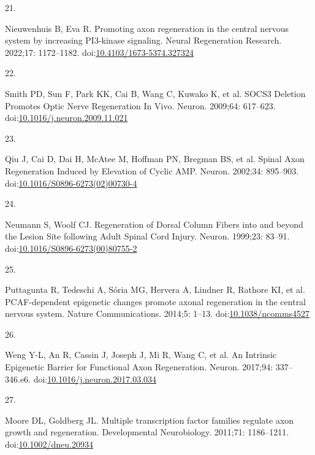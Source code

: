 \documentclass[
  12pt,
  a4paper,
]{book}
\newlength{\cslhangindent}
\newlength{\csllabelwidth}
\newlength{\cslentryspacingunit} %
\newenvironment{CSLReferences}[2] %
 {%
  \setlength{\parindent}{0pt}
  \ifodd #1
  \let\oldpar\par
  \def\par{\hangindent=\cslhangindent\oldpar}
  \fi
  \setlength{\parskip}{#2\cslentryspacingunit}
 }%
 {}
\newcommand{\CSLLeftMargin}[1]{\parbox[t]{\csllabelwidth}{#1}}
\newcommand{\CSLRightInline}[1]{\parbox[t]{\linewidth - \csllabelwidth}{#1}\break}
\begin{document}
\begin{CSLReferences}{0}{0}
\leavevmode{}%
\CSLLeftMargin{21. }%
\CSLRightInline{Nieuwenhuis B, Eva R. Promoting axon regeneration in the central nervous system by increasing {PI3-kinase} signaling. Neural Regeneration Research. 2022;17: 1172--1182. doi:\href{https://doi.org/10.4103/1673-5374.327324}{10.4103/1673-5374.327324}}

\leavevmode{}%
\CSLLeftMargin{22. }%
\CSLRightInline{Smith PD, Sun F, Park KK, Cai B, Wang C, Kuwako K, et al. {SOCS3 Deletion Promotes Optic Nerve Regeneration In Vivo}. Neuron. 2009;64: 617--623. doi:\href{https://doi.org/10.1016/j.neuron.2009.11.021}{10.1016/j.neuron.2009.11.021}}

\leavevmode{}%
\CSLLeftMargin{23. }%
\CSLRightInline{Qiu J, Cai D, Dai H, McAtee M, Hoffman PN, Bregman BS, et al. Spinal {Axon Regeneration Induced} by {Elevation} of {Cyclic AMP}. Neuron. 2002;34: 895--903. doi:\href{https://doi.org/10.1016/S0896-6273(02)00730-4}{10.1016/S0896-6273(02)00730-4}}

\leavevmode{}%
\CSLLeftMargin{24. }%
\CSLRightInline{Neumann S, Woolf CJ. Regeneration of {Dorsal Column Fibers} into and beyond the {Lesion Site} following {Adult Spinal Cord Injury}. Neuron. 1999;23: 83--91. doi:\href{https://doi.org/10.1016/S0896-6273(00)80755-2}{10.1016/S0896-6273(00)80755-2}}

\leavevmode{}%
\CSLLeftMargin{25. }%
\CSLRightInline{Puttagunta R, Tedeschi A, Sória MG, Hervera A, Lindner R, Rathore KI, et al. {PCAF-dependent} epigenetic changes promote axonal regeneration in the central nervous system. Nature Communications. 2014;5: 1--13. doi:\href{https://doi.org/10.1038/ncomms4527}{10.1038/ncomms4527}}

\leavevmode{}%
\CSLLeftMargin{26. }%
\CSLRightInline{Weng Y-L, An R, Cassin J, Joseph J, Mi R, Wang C, et al. An {Intrinsic Epigenetic Barrier} for {Functional Axon Regeneration}. Neuron. 2017;94: 337--346.e6. doi:\href{https://doi.org/10.1016/j.neuron.2017.03.034}{10.1016/j.neuron.2017.03.034}}

\leavevmode{}%
\CSLLeftMargin{27. }%
\CSLRightInline{Moore DL, Goldberg JL. Multiple transcription factor families regulate axon growth and regeneration. Developmental Neurobiology. 2011;71: 1186--1211. doi:\href{https://doi.org/10.1002/dneu.20934}{10.1002/dneu.20934}}


\end{CSLReferences}
\end{document}
